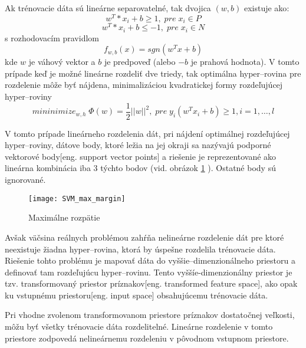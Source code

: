 Ak trénovacie dáta sú lineárne separovatelné, tak dvojica $(w, b)$ existuje ako\cite{prop:SupervisedMachineLearning}:
\begin{equation}
    \label{eq:SVMPair1}
    w^T * x_i + b \geq 1, \; pre \; x_i \in P
\end{equation}
\begin{equation}
    \label{eq:SVMPair2}
    w^T * x_i + b \leq -1, \; pre \; x_i \in N
\end{equation}
s rozhodovacím pravidlom
\begin{equation}
    \label{eq:SVMDecisionRule}
    f_{w,b}(x) = sgn(w^T x + b)
\end{equation}
kde $w$ je váhový vektor a $b$ je predpoveď (alebo $-b$ je prahová hodnota).
V tomto prípade keď je možné lineárne rozdeliť dve triedy, tak optimálna hyper--rovina pre rozdelenie
    môže byť nájdena, minimalizáciou kvadratickej formy rozdeľujúcej hyper--roviny
\begin{equation}
    \label{eq:SVMDecisionRule}
    mininimize_{w,h} \; \Phi(w) = \frac{1}{2}||w||^2, \; pre \; y_i(w^Tx_i + b) \geq 1, i = 1, \dots, l
\end{equation}

V tomto prípade lineárneho rozdelenia dát, pri nájdení optimálnej rozdeľujúcej hyper--roviny, dátove body, ktoré ležia na jej okraji
    sa nazývajú podporné vektorové body[eng. support vector points] a riešenie je reprezentované ako lineárna kombinácia iba 3 týchto bodov (vid. obrázok \ref{pic:SVMMAxMargin} ).
Ostatné body sú ignorované\cite{prop:SupervisedMachineLearning}.

\begin{figure}[H]
	\centering
	\texttt{[image: SVM\_max\_margin]}
	\caption{Maximálne rozpätie\cite{prop:SupervisedMachineLearning}}
	\label{pic:SVMMAxMargin}
\end{figure}

Avšak väčsina reálnych problémou zahŕňa nelineárne rozdelenie dát pre ktoré neexistuje žiadna hyper--rovina, ktorá by úspešne rozdelila trénovacie dáta.
Riešenie tohto problému je mapovať dáta do vyššie--dimenzionálneho priestoru a definovať tam rozdeľujúcu hyper--rovinu.
Tento vyššíe-dimenzionálny priestor je tzv. transformovaný priestor príznakov[eng. transformed feature space], ako opak ku vstupnému priestoru[eng. input space] obsahujúcemu trénovacie dáta\cite{prop:SupervisedMachineLearning}.

Pri vhodne zvolenom transformovanom priestore príznakov dostatočnej veľkosti, môžu byť všetky trénovacie dáta rozdelitelné.
Lineárne rozdelenie v tomto priestore zodpovedá nelineárnemu rozdeleniu v pôvodnom vstupnom priestore.

